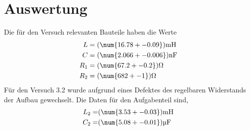 \section{Auswertung}
\label{sec:Auswertung}
Die für den Versuch relevanten Bauteile haben die Werte
\begin{align}
  L & = (\num{16.78 +- 0.09}) \text{mH}	\\
  C & = (\num{2.066 +- 0.006}) \text{nF} \\
  R_1 & = (\num{67.2 +- 0.2}) \Omega \\
  R_2 & = (\num{682 +- 1}) \Omega
  \label{eqn:Bau}
\end{align}
Für den Versuch 3.2 wurde aufgrund eines Defektes des regelbaren Widerstands der Aufbau gewechselt. Die Daten für den Aufgabenteil sind,
\begin{eqnarray}
  L_2 =& (\num{3.53 +- 0.03}) \text{mH}	\\
  C_2 =& (\num{5.08 +- 0.01}) \text{µF}
\end{eqnarray}
